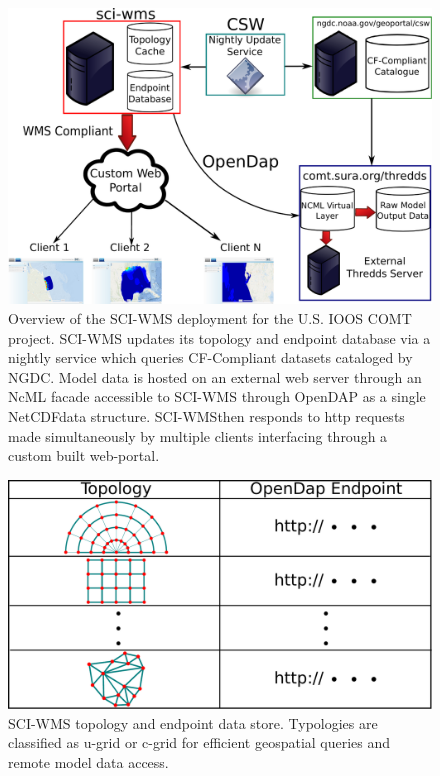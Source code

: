 \documentclass[11pt,twocolumn,twoside]{IEEEtran}
\newcommand{\comt}{COMT}
\newcommand{\ioos}{IOOS}
\newcommand{\ugrid}{u-grid}
\newcommand{\cgrid}{c-grid}
\newcommand{\ncml}{NcML}
\newcommand{\ngdc}{NGDC}
\newcommand{\opendap}{OpenDAP}
\newcommand{\netcdf}{NetCDF}
\newcommand{\sciwms}{SCI-WMS}
\newcommand{\Sciwms}{SCI-WMS}
\begin{document}
\begin{figure}
  \centering
  \includegraphics[width=\columnwidth]{./figs/overview.pdf}
  \caption{Overview of the \sciwms{} deployment for the U.S. \ioos{}
    \comt{} project. \Sciwms{} updates its topology and endpoint
    database via a nightly service which queries CF-Compliant datasets
    cataloged by \ngdc{}. Model data is hosted on an external web
    server through an \ncml{} facade accessible to \sciwms{} through
    \opendap{} as a single \netcdf data structure. \Sciwms then
    responds to http requests made simultaneously by multiple clients
    interfacing through a custom built web-portal.}
  \label{fig:overview1}
\end{figure}

\begin{figure}
  \centering
  \includegraphics[width=0.8\columnwidth]{./figs/sciwms_db_topology_endpoints.pdf}
  \caption{\Sciwms{} topology and endpoint data store. Typologies are
    classified as \ugrid{} or \cgrid{} for efficient geospatial
    queries and remote model data access.}
  \label{fig:sciwms_topology_endpoints}
\end{figure}
\end{document}
